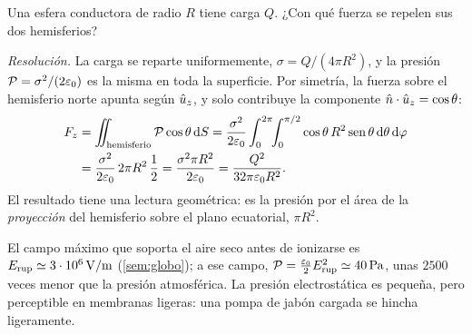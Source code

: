 \begin{ejemplo}\label{ej:hemisferios}
Una esfera conductora de radio $R$ tiene carga $Q$. ¿Con qué fuerza se repelen sus dos hemisferios?

\emph{Resolución.} La carga se reparte uniformemente, $\sigma=Q/(4\pi R^{2})$, y la presión $\mathcal{P}=\sigma^{2}/(2\varepsilon_{0})$ es la misma en toda la superficie. Por
simetría, la fuerza sobre el hemisferio norte apunta según $\hat{u}_{z}$, y solo contribuye la componente $\hat{n}\cdot\hat{u}_{z}=\cos\theta$:
\begin{align*}
  F_z&=\iint_{\text{hemisferio}}\mathcal{P}\cos\theta\,\mathrm{d} S
     =\frac{\sigma^{2}}{2\varepsilon_{0}}\int_{0}^{2\pi}\!\!\int_{0}^{\pi/2}\cos\theta\,R^{2}\operatorname{sen}\theta\,\mathrm{d}\theta\,\mathrm{d}\varphi\\
     &=\frac{\sigma^{2}}{2\varepsilon_{0}}\,2\pi R^{2}\,\frac12=\frac{\sigma^{2}\pi R^{2}}{2\varepsilon_{0}}=\frac{Q^{2}}{32\pi\varepsilon_{0} R^{2}} .
\end{align*}
El resultado tiene una lectura geométrica: es la presión por el área de la \emph{proyección} del hemisferio sobre el plano ecuatorial, $\pi R^{2}$.
\end{ejemplo}

\begin{observacion}\label{obs:presion-orden}
El campo máximo que soporta el aire seco antes de ionizarse es $E_{\mathrm{rup}}\simeq3\cdot10^{6}\,\mathrm{V/m}$ (\cref{sem:globo}); a ese campo,
$\mathcal{P}=\tfrac{\varepsilon_{0}}{2}E_{\mathrm{rup}}^{2}\simeq40\,\mathrm{Pa}$, unas $2500$ veces menor que la presión atmosférica. La presión electrostática es pequeña,
pero perceptible en membranas ligeras: una pompa de jabón cargada se hincha ligeramente.
\end{observacion}
